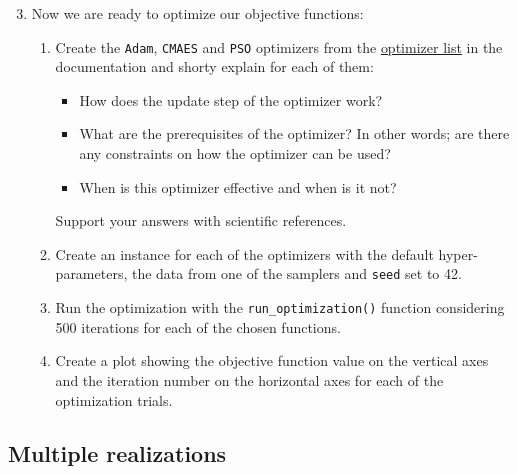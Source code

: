 \documentclass[10pt,a4paper,twoside]{article} %
\def\code#1{\texttt{#1}}
\begin{document}
\begin{enumerate}
	\setcounter{enumi}{2}
	\item Now we are ready to optimize our objective functions:
	\begin{enumerate} [label*=\arabic*.]
		\item Create the \code{Adam}, \code{CMAES} and \code{PSO} optimizers from the \href{https://bessagroup.github.io/F3DASM/capabilities/algorithms.html\#implemented-optimizers}{optimizer list} in the documentation and shorty explain for each of them:
		
		\begin{itemize}
			\item How does the update step of the optimizer work?
			\item What are the prerequisites of the optimizer? In other words; are there any constraints on how the optimizer can be used?
			\item When is this optimizer effective and when is it not?
		\end{itemize}
	
		Support your answers with scientific references.
		
		\item Create an instance for each of the optimizers with the default hyper-parameters, the data from one of the samplers and \code{seed} set to 42.
		
		\item Run the optimization with the \code{run\_optimization()} function considering 500 iterations for each of the chosen functions. 
		
		\item Create a plot showing the objective function value on the vertical axes and the iteration number on the horizontal axes for each of the optimization trials.
		

		
	\end{enumerate}
\end{enumerate}

\subsection*{Multiple realizations}
\end{document}
